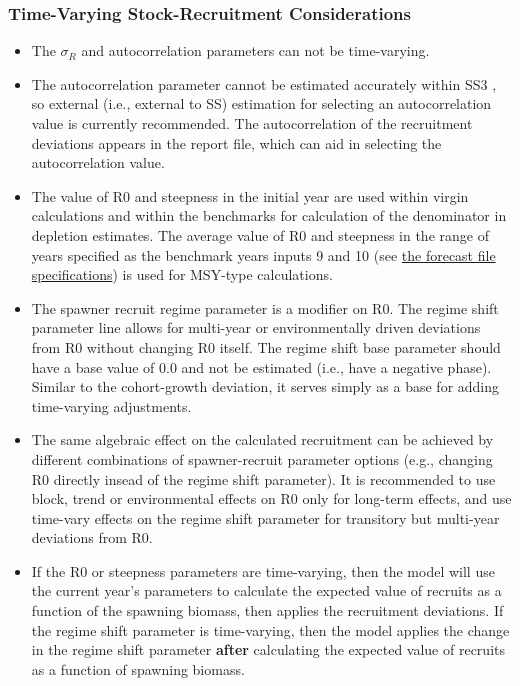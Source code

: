 \hypertarget{tv-sr}{}
\subsubsection{Time-Varying Stock-Recruitment Considerations}
\begin{itemize}
	
	\item The $\sigma_R$ and autocorrelation parameters can not be time-varying. 
	
	\item The autocorrelation parameter cannot be estimated accurately within SS3 \citep{johnson-can-2016}, so external (i.e., external to SS) estimation for selecting an autocorrelation value is currently recommended. The autocorrelation of the recruitment deviations appears in the report file, which can aid in selecting the autocorrelation value.
		
	\item The value of R0 and steepness in the initial year are used within virgin calculations and within the benchmarks for calculation of the denominator in depletion estimates. The average value of R0 and steepness in the range of years specified as the benchmark years inputs 9 and 10 (see \hyperlink{fore-specify}{the forecast file specifications}) is used for MSY-type calculations. 
	
	\item The spawner recruit regime parameter is a modifier on R0. The regime shift parameter line allows for multi-year or environmentally driven deviations from R0 without changing R0 itself. The regime shift base parameter should have a base value of 0.0 and not be estimated (i.e., have a negative phase). Similar to the cohort-growth deviation, it serves simply as a base for adding time-varying adjustments.
	
	\item The same algebraic effect on the calculated recruitment can be achieved by different combinations of spawner-recruit parameter options (e.g., changing R0 directly insead of the regime shift parameter). It is recommended to use block, trend or environmental effects on R0 only for long-term effects, and use time-vary effects on the regime shift parameter for transitory but multi-year deviations from R0.	
	
	\item If the R0 or steepness parameters are time-varying, then the model will use the current year's parameters to calculate the expected value of recruits as a function of the spawning biomass, then applies the recruitment deviations. If the regime shift parameter is time-varying, then the model applies the change in the regime shift parameter \textbf{after} calculating the expected value of recruits as a function of spawning biomass.

\end{itemize}



